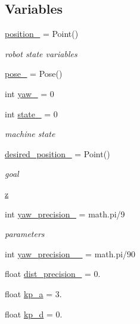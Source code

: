\subsection*{Variables}
\begin{DoxyCompactItemize}
\item 
\hyperlink{namespacenavigation__action_aa53bb3e42cba75b4faece7677fdf8b1d}{position\+\_\+} = Point()
\begin{DoxyCompactList}\small\item\em robot state variables \end{DoxyCompactList}\item 
\hyperlink{namespacenavigation__action_ad906a8ccc8be8e7aac7662be3092c3b7}{pose\+\_\+} = Pose()
\item 
int \hyperlink{namespacenavigation__action_aa356f2a5947d276649face9801529b11}{yaw\+\_\+} = 0
\item 
int \hyperlink{namespacenavigation__action_ac6656a4827fb720e3c7a7224940626d2}{state\+\_\+} = 0
\begin{DoxyCompactList}\small\item\em machine state \end{DoxyCompactList}\item 
\hyperlink{namespacenavigation__action_a7ce69adc83a1ee3d37d5e3c6e0e72e32}{desired\+\_\+position\+\_\+} = Point()
\begin{DoxyCompactList}\small\item\em goal \end{DoxyCompactList}\item 
\hyperlink{namespacenavigation__action_a5258daa88a84ac3fae37a796753c3a6f}{z}
\item 
int \hyperlink{namespacenavigation__action_a405244594bb4eea456e03e5b095d3869}{yaw\+\_\+precision\+\_\+} = math.\+pi/9
\begin{DoxyCompactList}\small\item\em parameters \end{DoxyCompactList}\item 
int \hyperlink{namespacenavigation__action_a8ff0e6466c43c2a149fb09b9678d56bf}{yaw\+\_\+precision\+\_\+\_\+} = math.\+pi/90
\item 
float \hyperlink{namespacenavigation__action_ae84ae6794723578c0bda3eb07d0f1387}{dist\+\_\+precision\+\_\+} = 0.
\item 
float \hyperlink{namespacenavigation__action_a88d77c73344c091f0e27e30f34b149cc}{kp\+\_\+a} = 3.
\item 
float \hyperlink{namespacenavigation__action_a34478a1ef79cccac170cae8f045a4018}{kp\+\_\+d} = 0.

\end{DoxyCompactItemize}
